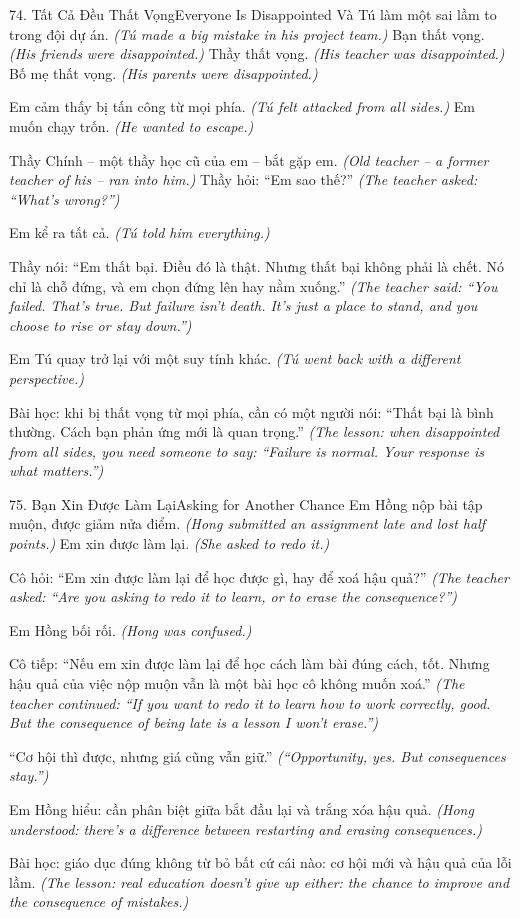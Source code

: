 \begin{truyen}{74. Tất Cả Đều Thất Vọng}{Everyone Is Disappointed}
Và Tú làm một sai lầm to trong đội dự án.
\textit{(Tú made a big mistake in his project team.)}
Bạn thất vọng.
\textit{(His friends were disappointed.)}
Thầy thất vọng.
\textit{(His teacher was disappointed.)}
Bố mẹ thất vọng.
\textit{(His parents were disappointed.)}

Em cảm thấy bị tấn công từ mọi phía.
\textit{(Tú felt attacked from all sides.)}
Em muốn chạy trốn.
\textit{(He wanted to escape.)}

Thầy Chính -- một thầy học cũ của em -- bắt gặp em.
\textit{(Old teacher -- a former teacher of his -- ran into him.)}
Thầy hỏi: ``Em sao thế?''
\textit{(The teacher asked: ``What's wrong?'')}

Em kể ra tất cả.
\textit{(Tú told him everything.)}

Thầy nói: ``Em thất bại. Điều đó là thật. Nhưng thất bại không phải là chết. Nó chỉ là chỗ đứng, và em chọn đứng lên hay nằm xuống.''
\textit{(The teacher said: ``You failed. That's true. But failure isn't death. It's just a place to stand, and you choose to rise or stay down.'')}

Em Tú quay trở lại với một suy tính khác.
\textit{(Tú went back with a different perspective.)}

Bài học: khi bị thất vọng từ mọi phía, cần có một người nói: ``Thất bại là bình thường. Cách bạn phản ứng mới là quan trọng.''
\textit{(The lesson: when disappointed from all sides, you need someone to say: ``Failure is normal. Your response is what matters.'')}
\end{truyen}

\begin{truyen}{75. Bạn Xin Được Làm Lại}{Asking for Another Chance}
Em Hồng nộp bài tập muộn, được giảm nửa điểm.
\textit{(Hong submitted an assignment late and lost half points.)}
Em xin được làm lại.
\textit{(She asked to redo it.)}

Cô hỏi: ``Em xin được làm lại để học được gì, hay để xoá hậu quả?''
\textit{(The teacher asked: ``Are you asking to redo it to learn, or to erase the consequence?'')}

Em Hồng bối rối.
\textit{(Hong was confused.)}

Cô tiếp: ``Nếu em xin được làm lại để học cách làm bài đúng cách, tốt. Nhưng hậu quả của việc nộp muộn vẫn là một bài học cô không muốn xoá.''
\textit{(The teacher continued: ``If you want to redo it to learn how to work correctly, good. But the consequence of being late is a lesson I won't erase.'')}

``Cơ hội thì được, nhưng giá cũng vẫn giữ.''
\textit{(``Opportunity, yes. But consequences stay.'')}

Em Hồng hiểu: cần phân biệt giữa bắt đầu lại và trắng xóa hậu quả.
\textit{(Hong understood: there's a difference between restarting and erasing consequences.)}

Bài học: giáo dục đúng không từ bỏ bất cứ cái nào: cơ hội mới và hậu quả của lỗi lầm.
\textit{(The lesson: real education doesn't give up either: the chance to improve and the consequence of mistakes.)}
\end{truyen}

